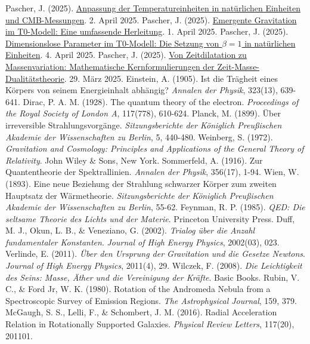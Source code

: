 \documentclass[12pt,a4paper]{article}
\begin{document}
\begin{thebibliography}{99}
		 Pascher, J. (2025). \href{https://github.com/jpascher/T0-Time-Mass-Duality/tree/main/2/pdf/Deutsch/Anpassung\%20von\%20Temperatureinheiten\%20in\%20natürlichen\%20Einheiten\%20und\%20CMB-Messungen.pdf}{Anpassung der Temperatureinheiten in natürlichen Einheiten und CMB-Messungen}. 2. April 2025.
		 Pascher, J. (2025). \href{https://github.com/jpascher/T0-Time-Mass-Duality/tree/main/2/pdf/Deutsch/Emergente\%20Gravitation\%20im\%20T0-Modell\%20Eine\%20formale\%20Herleitung.pdf}{Emergente Gravitation im T0-Modell: Eine umfassende Herleitung}. 1. April 2025.
		 Pascher, J. (2025). \href{https://github.com/jpascher/T0-Time-Mass-Duality/tree/main/2/pdf/Deutsch/Die Konsistenz von alpha = 1 und beta = 1.pdf}{Dimensionslose Parameter im T0-Modell: Die Setzung von \(\beta = 1\) in natürlichen Einheiten}. 4. April 2025.
		 Pascher, J. (2025). \href{https://github.com/jpascher/T0-Time-Mass-Duality/tree/main/2/pdf/Deutsch/Mathematische Formulierungen der Zeit-Masse-Dualitätstheorie mit Lagrange.pdf}{Von Zeitdilatation zu Massenvariation: Mathematische Kernformulierungen der Zeit-Masse-Dualitätstheorie}. 29. März 2025.
		 Einstein, A. (1905). Ist die Trägheit eines Körpers von seinem Energieinhalt abhängig? \textit{Annalen der Physik}, 323(13), 639-641.
		 Dirac, P. A. M. (1928). The quantum theory of the electron. \textit{Proceedings of the Royal Society of London A}, 117(778), 610-624.
		 Planck, M. (1899). Über irreversible Strahlungsvorgänge. \textit{Sitzungsberichte der Königlich Preußischen Akademie der Wissenschaften zu Berlin}, 5, 440-480.
		 Weinberg, S. (1972). \textit{Gravitation and Cosmology: Principles and Applications of the General Theory of Relativity}. John Wiley \& Sons, New York.
		 Sommerfeld, A. (1916). Zur Quantentheorie der Spektrallinien. \textit{Annalen der Physik}, 356(17), 1-94.
		 Wien, W. (1893). Eine neue Beziehung der Strahlung schwarzer Körper zum zweiten Hauptsatz der Wärmetheorie. \textit{Sitzungsberichte der Königlich Preußischen Akademie der Wissenschaften zu Berlin}, 55-62.
		 Feynman, R. P. (1985). \textit{QED: Die seltsame Theorie des Lichts und der Materie}. Princeton University Press.
		 Duff, M. J., Okun, L. B., \& Veneziano, G. (2002). \textit{Trialog über die Anzahl fundamentaler Konstanten}. \textit{Journal of High Energy Physics}, 2002(03), 023.
		 Verlinde, E. (2011). \textit{Über den Ursprung der Gravitation und die Gesetze Newtons}. \textit{Journal of High Energy Physics}, 2011(4), 29.
		 Wilczek, F. (2008). \textit{Die Leichtigkeit des Seins: Masse, Äther und die Vereinigung der Kräfte}. Basic Books.
		 Rubin, V. C., \& Ford Jr, W. K. (1980). Rotation of the Andromeda Nebula from a Spectroscopic Survey of Emission Regions. \textit{The Astrophysical Journal}, 159, 379.
		 McGaugh, S. S., Lelli, F., \& Schombert, J. M. (2016). Radial Acceleration Relation in Rotationally Supported Galaxies. \textit{Physical Review Letters}, 117(20), 201101.
	\end{thebibliography}
	
\end{document}
